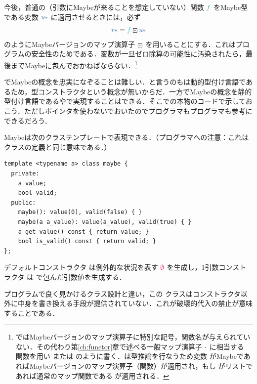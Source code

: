\documentclass[a5paper,twoside,fleqn,draft]{jsbook}
\begin{document}
今後，普通の（引数にMaybeが来ることを想定していない）関数 $\hFunc{f}$ をMaybe型である変数 $\mMaybe{u}$ に適用させるときには，必ず
\begin{equation}
  \mMaybe{v}
  =\hFunc{f}\mMapMaybe\mMaybe{u}
\end{equation}
のようにMaybeバージョンのマップ演算子 $\operatorname{\boxdot}$ を用いることにする．これはプログラムの安全性のためである．変数が一旦ゼロ除算の可能性に汚染されたら，最後までMaybeに包んでおかねばならない．\footnote{\haskell ではMaybeバージョンのマップ演算子に特別な記号，関数名が与えられていない．その代わり第\ref{ch:functor}章で述べる一般マップ演算子 $\operatorname{\cdot}$ に相当する  関数を用い  または  のように書く．\haskell は型推論を行なうため変数  がMaybeであればMaybeバージョンのマップ演算子（関数）が適用され，もし  がリストであれば通常のマップ関数である  が適用される．}

\python でMaybeの概念を忠実になぞることは難しい．と言うのも\python は動的型付け言語であるため，型コンストラクタという概念が無いからだ．一方でMaybeの概念を静的型付け言語である\cxx や\java で実現することはできる．そこで\cxx の本物のコードで示しておこう．ただしポインタを使わないでおいたので\cxx プログラマも\java プログラマも参考にできるだろう．

Maybeは次のクラステンプレートで表現できる．（\java プログラマへの注意：これはクラスの定義と同じ意味である．）
\begin{cxxcode}
\begin{verbatim}
template <typename a> class maybe {
  private:
    a value;
    bool valid;
  public:
    maybe(): value(0), valid(false) { }
    maybe(a a_value): value(a_value), valid(true) { }
    a get_value() const { return value; }
    bool is_valid() const { return valid; }
};
\end{verbatim}
\end{cxxcode}
デフォルトコンストラクタ  は例外的な状況を表す $\mNothing$ を生成し，1引数コンストラクタ  は  で包んだ引数値を生成する．

\cxx プログラムで良く見かけるクラス設計と違い，この  クラスはコンストラクタ以外に中身を書き換える手段が提供されていない．これが破壊的代入の禁止が意味することである．
\end{document}
